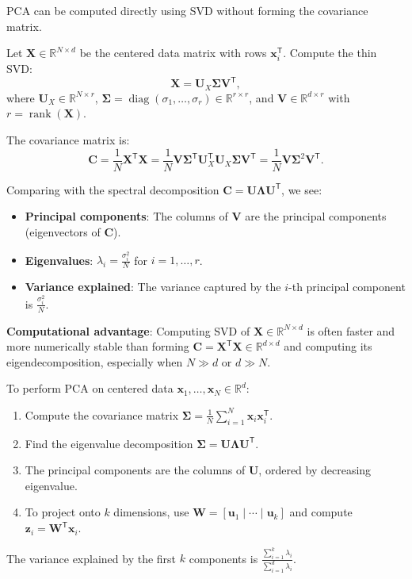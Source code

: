 \begin{remark}\label{rem:pca-svd}
  PCA can be computed directly using SVD without forming the covariance matrix.

  Let $\mathbf{X} \in \mathbb{R}^{N \times d}$ be the centered data matrix with rows $\mathbf{x}_i^{\mathsf{T}}$. Compute the thin SVD:
  \[
    \mathbf{X} = \mathbf{U}_X \mathbf{\Sigma} \mathbf{V}^{\mathsf{T}},
  \]
  where $\mathbf{U}_X \in \mathbb{R}^{N \times r}$, $\mathbf{\Sigma} = \operatorname{diag}(\sigma_1,\dots,\sigma_r) \in \mathbb{R}^{r \times r}$, and $\mathbf{V} \in \mathbb{R}^{d \times r}$ with $r = \operatorname{rank}(\mathbf{X})$.

  The covariance matrix is:
  \[
    \mathbf{C} = \frac{1}{N}\mathbf{X}^{\mathsf{T}}\mathbf{X} = \frac{1}{N}\mathbf{V}\mathbf{\Sigma}^{\mathsf{T}}\mathbf{U}_X^{\mathsf{T}}\mathbf{U}_X\mathbf{\Sigma}\mathbf{V}^{\mathsf{T}} = \frac{1}{N}\mathbf{V}\mathbf{\Sigma}^2\mathbf{V}^{\mathsf{T}}.
  \]

  Comparing with the spectral decomposition $\mathbf{C} = \mathbf{U}\mathbf{\Lambda}\mathbf{U}^{\mathsf{T}}$, we see:
  \begin{itemize}
    \item \textbf{Principal components}: The columns of $\mathbf{V}$ are the principal components (eigenvectors of $\mathbf{C}$).
    \item \textbf{Eigenvalues}: $\lambda_i = \frac{\sigma_i^2}{N}$ for $i = 1,\dots,r$.
    \item \textbf{Variance explained}: The variance captured by the $i$-th principal component is $\frac{\sigma_i^2}{N}$.
  \end{itemize}

  \textbf{Computational advantage}: Computing SVD of $\mathbf{X} \in \mathbb{R}^{N \times d}$ is often faster and more numerically stable than forming $\mathbf{C} = \mathbf{X}^{\mathsf{T}}\mathbf{X} \in \mathbb{R}^{d \times d}$ and computing its eigendecomposition, especially when $N \gg d$ or $d \gg N$.
\end{remark}

\begin{corollary}
  To perform PCA on centered data $\mathbf{x}_1,\dots,\mathbf{x}_N \in \mathbb{R}^d$:
  \begin{enumerate}
    \item Compute the covariance matrix $\mathbf{\Sigma} = \frac{1}{N}\sum_{i=1}^{N} \mathbf{x}_i\mathbf{x}_i^{\mathsf{T}}$.
    \item Find the eigenvalue decomposition $\mathbf{\Sigma} = \mathbf{U}\mathbf{\Lambda}\mathbf{U}^{\mathsf{T}}$.
    \item The principal components are the columns of $\mathbf{U}$, ordered by decreasing eigenvalue.
    \item To project onto $k$ dimensions, use $\mathbf{W} = [\mathbf{u}_1 \mid \cdots \mid \mathbf{u}_k]$ and compute $\mathbf{z}_i = \mathbf{W}^{\mathsf{T}}\mathbf{x}_i$.
  \end{enumerate}
  The variance explained by the first $k$ components is $\frac{\sum_{i=1}^{k}\lambda_i}{\sum_{i=1}^{d}\lambda_i}$.
\end{corollary}


